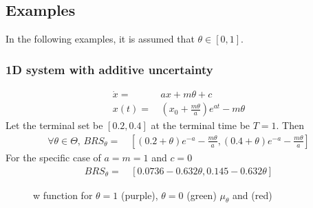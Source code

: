 \documentclass[10pt]{scrartcl}
\theoremstyle{remark}
\begin{document}
\subsection{Examples}
In the following examples, it is assumed that $\theta\in [0,1]$.
\subsubsection{1D system with additive uncertainty}
\begin{align}
	\dot x =&\, ax+m\theta+c\\
	x(t)=&\, \left(x_0+\frac{m\theta}{a}\right)e^{at}-m\theta
\end{align}
Let the terminal set be $[0.2,0.4]$ at the terminal time be $T=1$. Then
\begin{align}
\forall \theta\in \Theta,\, BRS_\theta=&\,\left[(0.2+\theta)e^{-a}-\frac{m\theta}{a},(0.4+\theta)e^{-a}-\frac{m\theta}{a}\right]
\end{align}
For the specific case of $a=m=1$ and $c=0$
\begin{align}
BRS_\theta=&\,[0.0736-0.632\theta,0.145-0.632\theta]
\end{align}

\begin{figure}[!ht]%
\centering
{}
\caption{w function for $\theta=1$ (purple), $\theta=0$ (green) $\mu_\theta$ and (red)}%
\end{figure}
\end{document}
